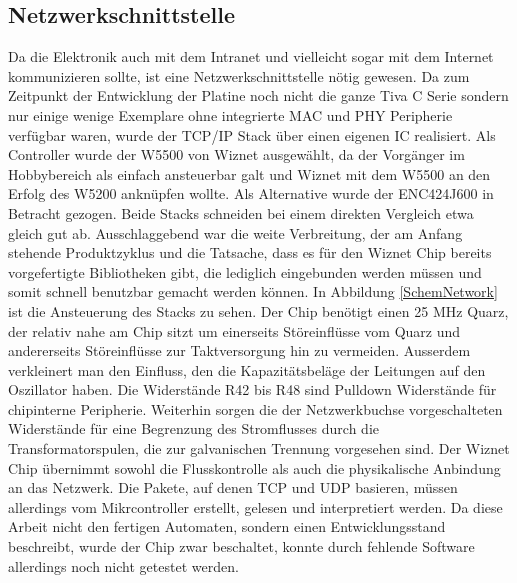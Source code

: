 \documentclass{scrartcl}
\begin{document}
 \subsection{Netzwerkschnittstelle}
Da die Elektronik auch mit dem Intranet und vielleicht sogar mit dem Internet kommunizieren sollte, ist eine Netzwerkschnittstelle nötig gewesen. Da zum Zeitpunkt der Entwicklung der Platine noch nicht die ganze Tiva C Serie sondern nur einige wenige Exemplare ohne integrierte MAC und PHY Peripherie verfügbar waren, wurde der TCP/IP Stack über einen eigenen IC realisiert. Als Controller wurde der W5500 von Wiznet ausgewählt, da der Vorgänger im Hobbybereich als einfach ansteuerbar galt und Wiznet mit dem W5500 an den Erfolg des W5200 anknüpfen wollte. Als Alternative wurde der ENC424J600 in Betracht gezogen. Beide Stacks schneiden bei einem direkten Vergleich etwa gleich gut ab. Ausschlaggebend war die weite Verbreitung, der am Anfang stehende Produktzyklus und die Tatsache, dass es für den Wiznet Chip bereits vorgefertigte Bibliotheken gibt, die lediglich eingebunden werden müssen und somit schnell benutzbar gemacht werden können. \newline
In Abbildung \ref{SchemNetwork} ist die Ansteuerung des Stacks zu sehen. Der Chip benötigt einen 25 MHz Quarz, der relativ nahe am Chip sitzt um einerseits Störeinflüsse vom Quarz und andererseits Störeinflüsse zur Taktversorgung hin zu vermeiden. Ausserdem verkleinert man den Einfluss, den die Kapazitätsbeläge der Leitungen auf den Oszillator haben. Die Widerstände R42 bis R48 sind Pulldown Widerstände für chipinterne Peripherie. Weiterhin sorgen die der Netzwerkbuchse vorgeschalteten Widerstände für eine Begrenzung des Stromflusses durch die Transformatorspulen, die zur galvanischen Trennung vorgesehen sind. \newline
Der Wiznet Chip übernimmt sowohl die Flusskontrolle als auch die physikalische Anbindung an das Netzwerk. Die Pakete, auf denen TCP und UDP basieren, müssen allerdings vom Mikrcontroller erstellt, gelesen und interpretiert werden. Da diese Arbeit nicht den fertigen Automaten, sondern einen Entwicklungsstand beschreibt, wurde der Chip zwar beschaltet, konnte durch fehlende Software allerdings noch nicht getestet werden.
\end{document}

